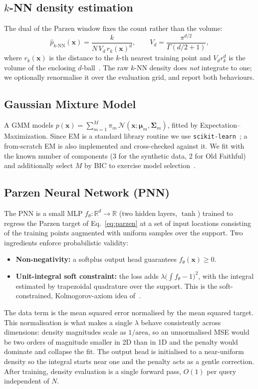 \documentclass[11pt,a4paper]{article}
\begin{document}
\subsection{$k$-NN density estimation}
The dual of the Parzen window fixes the count rather than the volume:
\begin{equation}
\hat p_{k\text{-NN}}(\mathbf{x}) = \frac{k}{N\, V_d\, r_k(\mathbf{x})^d},
\qquad V_d = \frac{\pi^{d/2}}{\Gamma(d/2+1)},
\end{equation}
where $r_k(\mathbf{x})$ is the distance to the $k$-th nearest training point and
$V_d r_k^d$ is the volume of the enclosing $d$-ball~\cite{duda2001}. The raw
$k$-NN density does \emph{not} integrate to one; we optionally renormalise it
over the evaluation grid, and report both behaviours.

\subsection{Gaussian Mixture Model}
A GMM models $p(\mathbf{x})=\sum_{m=1}^{M}\pi_m\,\mathcal{N}(\mathbf{x};
\boldsymbol{\mu}_m,\boldsymbol{\Sigma}_m)$, fitted by Expectation--Maximization.
Since EM is a standard library routine we use
\texttt{scikit-learn}~\cite{pedregosa2011}; a from-scratch EM is also implemented
and cross-checked against it. We fit with the known number of components (3 for
the synthetic data, 2 for Old Faithful) and additionally select $M$ by BIC to
exercise model selection~\cite{bishop2006}.

\subsection{Parzen Neural Network (PNN)}
The PNN is a small MLP $f_\theta:\mathbb{R}^d\!\to\!\mathbb{R}$
(two hidden layers, $\tanh$) trained to regress the Parzen target of
Eq.~\eqref{eq:parzen} at a set of input locations consisting of the training
points augmented with uniform samples over the support. Two ingredients enforce
probabilistic validity:
\begin{itemize}
  \item \textbf{Non-negativity:} a softplus output head guarantees
  $f_\theta(\mathbf{x})\ge 0$.
  \item \textbf{Unit-integral soft constraint:} the loss adds
  $\lambda\bigl(\textstyle\int f_\theta - 1\bigr)^2$, with the integral estimated
  by trapezoidal quadrature over the support. This is the soft-constrained,
  Kolmogorov-axiom idea of~\cite{trentin2018soft}.
\end{itemize}
The data term is the mean squared error normalised by the mean squared target.
This normalisation is what makes a single $\lambda$ behave consistently across
dimensions: density magnitudes scale as $1/\text{area}$, so an unnormalised MSE
would be two orders of magnitude smaller in 2D than in 1D and the penalty would
dominate and collapse the fit. The output head is initialised to a near-uniform
density so the integral starts near one and the penalty acts as a gentle
correction. After training, density evaluation is a single forward pass,
$O(1)$ per query independent of $N$.
\end{document}
